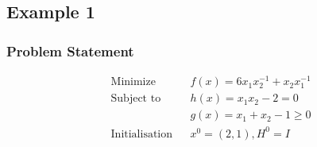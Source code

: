 \documentclass{article}
\begin{document}
\subsection*{Example 1}
\subsubsection*{Problem Statement}
\begin{equation*}
    \begin{aligned}
        & \text{Minimize}
        & & f(x) = 6x_1x_2^{-1} + x_2x_1^{-1} \\
        & \text{Subject to}
        & & h(x) = x_1x_2 - 2 = 0\\
        &&& g(x) = x_1 + x_2 -1 \geq 0\\
        & \text{Initialisation}
        & & x^0 = (2,1) , H^0 = I
    \end{aligned}
\end{equation*}
\end{document}
